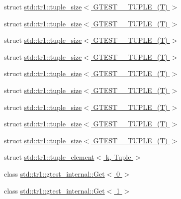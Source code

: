 \begin{DoxyCompactItemize}
\item 
struct \hyperlink{structstd_1_1tr1_1_1tuple__size_3_01_g_t_e_s_t__2___t_u_p_l_e___07_t_08_01_4}{std\-::tr1\-::tuple\-\_\-size$<$ G\-T\-E\-S\-T\-\_\-\_\-\-T\-U\-P\-L\-E\-\_\-(\-T) $>$}
\item 
struct \hyperlink{structstd_1_1tr1_1_1tuple__size_3_01_g_t_e_s_t__3___t_u_p_l_e___07_t_08_01_4}{std\-::tr1\-::tuple\-\_\-size$<$ G\-T\-E\-S\-T\-\_\-\_\-\-T\-U\-P\-L\-E\-\_\-(\-T) $>$}
\item 
struct \hyperlink{structstd_1_1tr1_1_1tuple__size_3_01_g_t_e_s_t__4___t_u_p_l_e___07_t_08_01_4}{std\-::tr1\-::tuple\-\_\-size$<$ G\-T\-E\-S\-T\-\_\-\_\-\-T\-U\-P\-L\-E\-\_\-(\-T) $>$}
\item 
struct \hyperlink{structstd_1_1tr1_1_1tuple__size_3_01_g_t_e_s_t__5___t_u_p_l_e___07_t_08_01_4}{std\-::tr1\-::tuple\-\_\-size$<$ G\-T\-E\-S\-T\-\_\-\_\-\-T\-U\-P\-L\-E\-\_\-(\-T) $>$}
\item 
struct \hyperlink{structstd_1_1tr1_1_1tuple__size_3_01_g_t_e_s_t__6___t_u_p_l_e___07_t_08_01_4}{std\-::tr1\-::tuple\-\_\-size$<$ G\-T\-E\-S\-T\-\_\-\_\-\-T\-U\-P\-L\-E\-\_\-(\-T) $>$}
\item 
struct \hyperlink{structstd_1_1tr1_1_1tuple__size_3_01_g_t_e_s_t__7___t_u_p_l_e___07_t_08_01_4}{std\-::tr1\-::tuple\-\_\-size$<$ G\-T\-E\-S\-T\-\_\-\_\-\-T\-U\-P\-L\-E\-\_\-(\-T) $>$}
\item 
struct \hyperlink{structstd_1_1tr1_1_1tuple__size_3_01_g_t_e_s_t__8___t_u_p_l_e___07_t_08_01_4}{std\-::tr1\-::tuple\-\_\-size$<$ G\-T\-E\-S\-T\-\_\-\_\-\-T\-U\-P\-L\-E\-\_\-(\-T) $>$}
\item 
struct \hyperlink{structstd_1_1tr1_1_1tuple__size_3_01_g_t_e_s_t__9___t_u_p_l_e___07_t_08_01_4}{std\-::tr1\-::tuple\-\_\-size$<$ G\-T\-E\-S\-T\-\_\-\_\-\-T\-U\-P\-L\-E\-\_\-(\-T) $>$}
\item 
struct \hyperlink{structstd_1_1tr1_1_1tuple__size_3_01_g_t_e_s_t__10___t_u_p_l_e___07_t_08_01_4}{std\-::tr1\-::tuple\-\_\-size$<$ G\-T\-E\-S\-T\-\_\-\_\-\-T\-U\-P\-L\-E\-\_\-(\-T) $>$}
\item 
struct \hyperlink{structstd_1_1tr1_1_1tuple__element}{std\-::tr1\-::tuple\-\_\-element$<$ k, Tuple $>$}
\item 
class \hyperlink{classstd_1_1tr1_1_1gtest__internal_1_1_get_3_010_01_4}{std\-::tr1\-::gtest\-\_\-internal\-::\-Get$<$ 0 $>$}
\item 
class \hyperlink{classstd_1_1tr1_1_1gtest__internal_1_1_get_3_011_01_4}{std\-::tr1\-::gtest\-\_\-internal\-::\-Get$<$ 1 $>$}

\end{DoxyCompactItemize}
